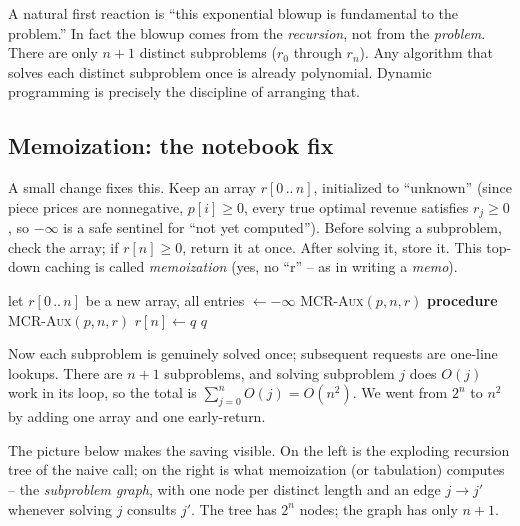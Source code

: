 \begin{trapbox}
A natural first reaction is ``this exponential blowup is fundamental to the
problem.'' In fact the blowup comes from the \emph{recursion}, not from
the \emph{problem}. There are only $n+1$ distinct subproblems ($r_0$ through
$r_n$). Any algorithm that solves each distinct subproblem once is already
polynomial. Dynamic programming is precisely the discipline of arranging that.
\end{trapbox}

\subsection{Memoization: the notebook fix}

A small change fixes this. Keep an array $r[0\,..\,n]$,
initialized to ``unknown'' (since piece prices are nonnegative, $p[i] \ge 0$, every true optimal revenue satisfies $r_j \ge 0$, so $-\infty$ is a safe sentinel for ``not yet computed''). Before solving a
subproblem, check the array; if $r[n] \ge 0$, return it at once. After
solving it, store it. This top-down caching is called \emph{memoization}
(yes, no ``r'' -- as in writing a \emph{memo}).

\begin{algorithm}[H]
\caption{\textsc{Memoized-Cut-Rod}$(p, n)$}
let $r[0\,..\,n]$ be a new array, all entries $\gets -\infty$\;
\Return \textsc{MCR-Aux}$(p, n, r)$\;
\BlankLine
\textbf{procedure} \textsc{MCR-Aux}$(p, n, r)$\;
$r[n] \gets q$\;
\Return $q$\;
\end{algorithm}

Now each subproblem is genuinely solved once; subsequent requests are
one-line lookups. There are $n+1$ subproblems, and solving subproblem $j$ does
$O(j)$ work in its loop, so the total is $\sum_{j=0}^{n} O(j) = O(n^2)$. We
went from $2^n$ to $n^2$ by adding one array and one early-return.

The picture below makes the saving visible. On the left is the exploding
recursion tree of the naive call; on the right is what memoization (or
tabulation) computes -- the \emph{subproblem graph}, with one node per
distinct length and an edge $j \to j'$ whenever solving $j$ consults $j'$.
The tree has $2^n$ nodes; the graph has only $n+1$.

